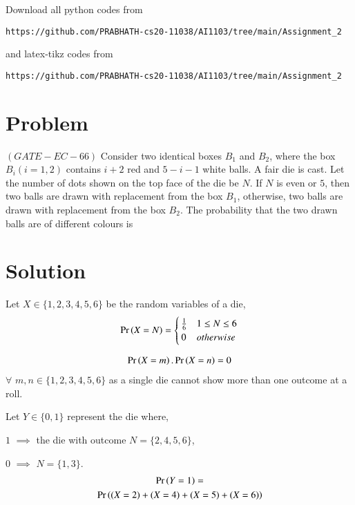 \documentclass[journal,12pt,twocolumn]{IEEEtran}
\begin{document}
Download all python codes from 
\begin{lstlisting}
https://github.com/PRABHATH-cs20-11038/AI1103/tree/main/Assignment_2
\end{lstlisting}

and latex-tikz codes from
\begin{lstlisting}
https://github.com/PRABHATH-cs20-11038/AI1103/tree/main/Assignment_2
\end{lstlisting}

\section{Problem}

$(GATE-EC-66)$ Consider two identical boxes $B_1$ and $B_2$, where the box $B_i(i = 1, 2)$ contains $i + 2$ red and $5−i−1$ white balls. A fair die is cast. Let the number of dots shown on the top face of the die be $N$. If $N$ is even or $5$, then two balls are drawn with replacement from the box $B_1$, otherwise, two balls are drawn with replacement from the box $B_2$. The probability that the two drawn balls are of different colours is

\section{Solution}

Let $X \in \{1,2,3,4,5,6\}$ be the random variables of a die,
\begin{align}
    \Pr\left(X=N\right) =
    \begin{cases}
    \frac{1}{6} & 1 \leq N \leq 6\\
    0 & otherwise
    \end{cases}
\end{align}

\begin{align}\label{eq1}
    \Pr\left(X=m\right).\Pr\left(X=n\right)=0
\end{align}
$\forall$ $m,n \in \{1,2,3,4,5,6\}$ as a single die cannot show more than one outcome at a roll.

\vspace{0.01in}

Let $Y \in \{0, 1\}$ represent the die where,

$1$ $\implies$ the die with outcome $N = \{ 2, 4, 5, 6\}$,

$0$ $\implies$ $N = \{ 1, 3\}$.
\begin{multline}
    \Pr\left(Y=1\right)=\\
    \Pr\left((X=2)+(X=4)+(X=5)+(X=6)\right)
\end{multline}
\end{document}
